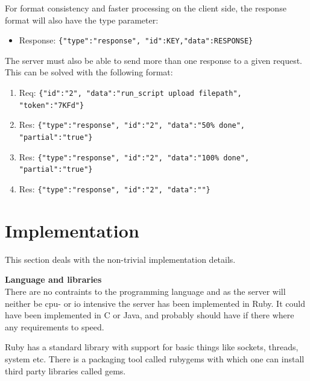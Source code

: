 For format consistency and faster processing on the client side, the response format will also have the type parameter:

\begin{itemize}
	\item Response: \texttt{\{"type":"response", "id":KEY,"data":RESPONSE\}}
\end{itemize}

The server must also be able to send more than one response to a given request. This can be solved with the following format:

\begin{enumerate}
	\item Req: \texttt{\{"id":"2", "data":"run\_script upload filepath", "token":"7KFd"\}}
	\item Res: \texttt{\{"type":"response", "id":"2", "data":"50\% done", "partial":"true"\}}
	\item Res: \texttt{\{"type":"response", "id":"2", "data":"100\% done", "partial":"true"\}}
	\item Res: \texttt{\{"type":"response", "id":"2", "data":""\}}
\end{enumerate}

























\section{Implementation}
This section deals with the non-trivial implementation details.

\textbf{Language and libraries} \\
There are no contraints to the programming language and as the server will neither be cpu- or io intensive the server has been implemented in Ruby. It could have been implemented in C or Java, and probably should have if there where any requirements to speed.

Ruby has a standard library with support for basic things like sockets, threads, system etc. There is a packaging tool called rubygems with which one can install third party libraries called gems.

